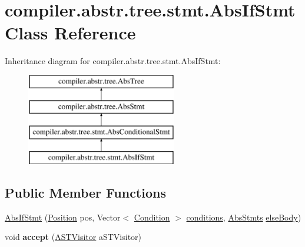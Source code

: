 \hypertarget{classcompiler_1_1abstr_1_1tree_1_1stmt_1_1_abs_if_stmt}{}\section{compiler.\+abstr.\+tree.\+stmt.\+Abs\+If\+Stmt Class Reference}
\label{classcompiler_1_1abstr_1_1tree_1_1stmt_1_1_abs_if_stmt}
Inheritance diagram for compiler.\+abstr.\+tree.\+stmt.\+Abs\+If\+Stmt\+:\begin{figure}[H]
\begin{center}
\leavevmode
\includegraphics[height=4.000000cm]{classcompiler_1_1abstr_1_1tree_1_1stmt_1_1_abs_if_stmt}
\end{center}
\end{figure}
\subsection*{Public Member Functions}
\begin{DoxyCompactItemize}
\item 
\hyperlink{classcompiler_1_1abstr_1_1tree_1_1stmt_1_1_abs_if_stmt_af68c09d1f84a735be7de041251f44acc}{Abs\+If\+Stmt} (\hyperlink{classcompiler_1_1_position}{Position} pos, Vector$<$ \hyperlink{classcompiler_1_1abstr_1_1tree_1_1_condition}{Condition} $>$ \hyperlink{classcompiler_1_1abstr_1_1tree_1_1stmt_1_1_abs_if_stmt_ae0bcb1a3a7a2633718a6fae1e50c4d65}{conditions}, \hyperlink{classcompiler_1_1abstr_1_1tree_1_1_abs_stmts}{Abs\+Stmts} \hyperlink{classcompiler_1_1abstr_1_1tree_1_1stmt_1_1_abs_if_stmt_a067f9cb00ae72b23eccd8e81413a1865}{else\+Body})
\item 
\mbox{\label{classcompiler_1_1abstr_1_1tree_1_1stmt_1_1_abs_if_stmt_a61062e5b2f85d7a654825d142bb59bb5}} 
void {\bfseries accept} (\hyperlink{interfacecompiler_1_1abstr_1_1_a_s_t_visitor}{A\+S\+T\+Visitor} a\+S\+T\+Visitor)
\end{DoxyCompactItemize}
